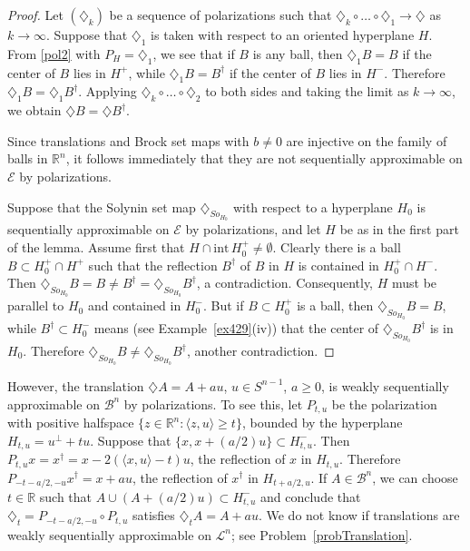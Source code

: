 \documentclass[12pt,reqno]{amsart}
\newcommand{\R}{{\mathbb R}}
\newcommand{\cL}{\mathcal L}
\newcommand{\cE}{{\mathcal E}}
\newcommand{\inte}{{\mathrm{int}}\,}
\newcommand{\di}{\diamondsuit}
\numberwithin{equation}{section}
\begin{document}
\begin{proof}
Let $(\di_k)$ be a sequence of polarizations such that $\di_k\circ\dots\circ \di_1\to \di$ as $k\to\infty$. Suppose that $\di_1$ is taken with respect to an oriented hyperplane $H$.  From \eqref{pol2} with $P_H=\di_1$, we see that if $B$ is any ball, then $\di_1 B=B$ if the center of $B$ lies in $H^+$, while $\di_1 B=B^{\dagger}$ if the center of $B$ lies in $H^-$.  Therefore
$\di_1 B=\di_1 B^{\dagger}$. Applying $\di_k\circ\dots\circ \di_2$ to both sides and taking the limit as $k\to\infty$, we obtain $\di B=\di B^{\dagger}$.

Since translations and Brock set maps with $b\ne 0$ are injective on the family of balls in $\R^n$, it follows immediately that they are not sequentially approximable on $\cE$ by polarizations.

Suppose that the Solynin set map $\di_{So_{H_0}}$ with respect to a hyperplane $H_0$ is sequentially approximable on $\cE$ by polarizations, and let $H$ be as in the first part of the lemma.  Assume first that $H\cap \inte H_0^+\neq\emptyset$. Clearly there is a ball $B\subset H_0^+\cap H^+$ such that the reflection $B^{\dagger}$ of $B$ in $H$ is contained in $H_0^+\cap H^-$.  Then $\di_{So_{H_0}}B=B\neq B^{\dagger}=\di_{So_{H_0}} B^{\dagger}$, a contradiction. Consequently, $H$ must be parallel to $H_0$ and contained in $H_0^-$. But if $B\subset H_0^+$ is a ball, then $\di_{So_{H_0}}B=B$, while $B^{\dagger}\subset H_0^-$ means (see Example~\ref{ex429}(iv)) that the center of $\di_{So_{H_0}}B^{\dagger}$ is in $H_0$.  Therefore $\di_{So_{H_0}}B\neq \di_{So_{H_0}} B^{\dagger}$, another contradiction.
\end{proof}

However, the translation $\di A=A+au$, $u\in S^{n-1}$, $a\ge 0$, is weakly sequentially approximable on ${\mathcal B}^n$ by polarizations.  To see this, let $P_{t,u}$ be the polarization with positive halfspace $\{z\in \R^n:\langle z,u\rangle \ge t\}$, bounded by the hyperplane $H_{t,u}=u^{\perp}+tu$.  Suppose that $\{x,x+(a/2)u\}\subset H^-_{t,u}$. Then $P_{{t,u}}x=x^{\dagger} =x-2(\langle x,u\rangle-t)u$, the reflection of $x$ in $H_{t,u}$. Therefore $P_{{-t-a/2,-u}}x^{\dagger}=x+au$, the reflection of $x^{\dagger}$ in $H_{t+a/2,u}$. If $A\in {\mathcal B}^n$, we can choose $t\in \R$ such that $A\cup (A+(a/2)u)\subset H^-_{t,u}$ and conclude that $\di_t=P_{-t-a/2,-u}\circ P_{t,u}$ satisfies $\di_t A=A+au$. We do not know if translations are weakly sequentially approximable on $\cL^n$; see Problem~\ref{probTranslation}.
\end{document}
